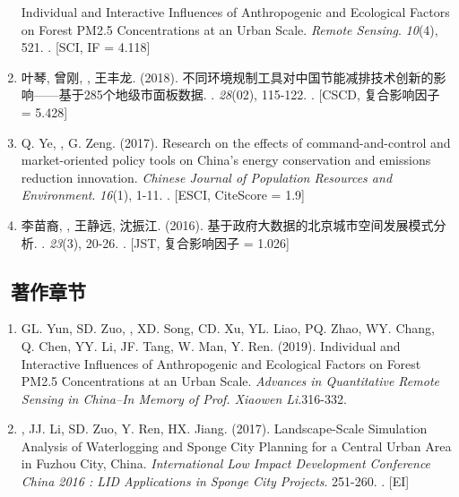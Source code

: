\begin{enumerate}
	Individual and Interactive Influences of Anthropogenic and Ecological Factors on Forest PM2.5 Concentrations at an Urban Scale.
    \textit{Remote Sensing}. \textit{10}(4), 521.
    . [SCI, IF = 4.118]
\item
    叶琴, 曾刚, {}, 王丰龙. (2018).
	不同环境规制工具对中国节能减排技术创新的影响——基于285个地级市面板数据.
    {}. \textit{28}(02), 115-122.
    . [CSCD, 复合影响因子 = 5.428]
\item
    Q. Ye, \Shaoqing, G. Zeng. (2017).
	Research on the effects of command-and-control and market-oriented policy tools on China’s energy conservation and emissions reduction innovation.
    \textit{Chinese Journal of Population Resources and Environment}. \textit{16}(1), 1-11.
    . [ESCI, CiteScore = 1.9]
\item
   李苗裔, {}, 王静远, 沈振江. (2016).
	基于政府大数据的北京城市空间发展模式分析.
    {}. \textit{23}(3), 20-26.
    . [JST, 复合影响因子 = 1.026]
\end{enumerate}

\subsection*{\texorpdfstring{\faBook\ 著作章节}{著作章节}}
\begin{enumerate}
\item
    GL. Yun, SD. Zuo, \Shaoqing, XD. Song, CD. Xu, YL. Liao, PQ. Zhao, WY. Chang, Q. Chen, YY. Li, JF. Tang, W. Man, Y. Ren. (2019).
	Individual and Interactive Influences of Anthropogenic and Ecological Factors on Forest PM2.5 Concentrations at an Urban Scale.
    \textit{Advances in Quantitative Remote Sensing in China–In Memory of Prof. Xiaowen Li}.316-332.
\item
    \Shaoqing, JJ. Li, SD. Zuo, Y. Ren, HX. Jiang. (2017).
	Landscape-Scale Simulation Analysis of Waterlogging and Sponge City Planning for a Central Urban Area in Fuzhou City, China.
    \textit{International Low Impact Development Conference China 2016 : LID Applications in Sponge City Projects}. 251-260.
    . [EI]
\end{enumerate}

